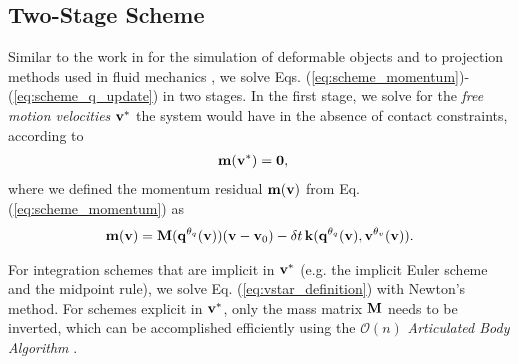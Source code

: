 \subsection{Two-Stage Scheme}
Similar to the work in \cite{bib:duriez2005realistic} for the simulation of
deformable objects and to projection methods used in fluid mechanics
\cite{bib::bell1991efficient}, we solve Eqs.
(\ref{eq:scheme_momentum})-(\ref{eq:scheme_q_update}) in two stages. In the
first stage, we solve for the \emph{free motion velocities} ${\mathbf{v}}^*$ the
system would have in the absence of contact constraints, according to
\begin{align}
	\mf{m}(\mf{v}^*) &= \mf{0},
	\label{eq:vstar_definition}
\end{align}
where we defined the momentum residual ${\mathbf{m}}({\mathbf{v}})$ from Eq.
(\ref{eq:scheme_momentum}) as
\begin{multline}
	\mf{m}(\mf{v}) =
	\mf{M}(\mf{q}^{\theta_{q}}(\mf{v}))(\mf{v}-\mf{v}_0) -
	\delta t\,\mf{k}(\mf{q}^{\theta_{q}}(\mf{v}),\mf{v}^{\theta_v}(\mf{v})).
	\label{eq:m_definition}
\end{multline}

For integration schemes that are implicit in ${\mathbf{v}}^*$ (e.g. the implicit Euler
scheme and the midpoint rule), we solve Eq. (\ref{eq:vstar_definition}) with
Newton's method. For schemes explicit in ${\mathbf{v}}^*$, only the mass matrix
${\mathbf{M}}$ needs to be inverted, which can be accomplished efficiently using the
$\mathcal{O}(n)$ \emph{Articulated Body Algorithm}
\cite{bib:featherstone2008_rigid_body_dynamics_algorithms}.

